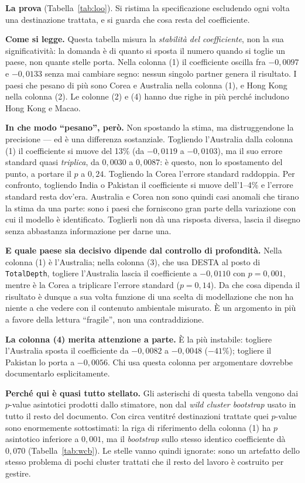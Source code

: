 \documentclass[11pt,a4paper]{article}
\begin{document}
\textbf{La prova} (Tabella~\ref{tab:loo}). Si ristima la specificazione escludendo ogni volta
una destinazione trattata, e si guarda che cosa resta del coefficiente.

\textbf{Come si legge.} Questa tabella misura la \emph{stabilit\`a del coefficiente}, non la
sua significativit\`a: la domanda \`e di quanto si sposta il numero quando si toglie un paese,
non quante stelle porta. Nella colonna (1) il coefficiente oscilla fra $-0{,}0097$ e
$-0{,}0133$ senza mai cambiare segno: nessun singolo partner genera il risultato. I paesi che
pesano di pi\`u sono Corea e Australia nella colonna (1), e Hong Kong nella colonna (2). Le
colonne (2) e (4) hanno due righe in pi\`u perch\'e includono Hong Kong e Macao.

\textbf{In che modo ``pesano'', per\`o.} Non spostando la stima, ma distruggendone la
precisione --- ed \`e una differenza sostanziale. Togliendo l'Australia dalla colonna (1) il
coefficiente si muove del 13\% (da $-0{,}0119$ a $-0{,}0103$), ma il suo errore standard
quasi \emph{triplica}, da $0{,}0030$ a $0{,}0087$: \`e questo, non lo spostamento del punto,
a portare il $p$ a $0{,}24$. Togliendo la Corea l'errore standard raddoppia. Per confronto,
togliendo India o Pakistan il coefficiente si muove dell'1--4\% e l'errore standard resta
dov'era. Australia e Corea non sono quindi casi anomali che tirano la stima da una parte:
sono i paesi che forniscono gran parte della variazione con cui il modello \`e identificato.
Toglierli non d\`a una risposta diversa, lascia il disegno senza abbastanza informazione per
darne una.

\textbf{E quale paese sia decisivo dipende dal controllo di profondit\`a.} Nella colonna (1)
\`e l'Australia; nella colonna (3), che usa DESTA al posto di \texttt{TotalDepth}, togliere
l'Australia lascia il coefficiente a $-0{,}0110$ con $p=0{,}001$, mentre \`e la Corea a
triplicare l'errore standard ($p=0{,}14$). Da che cosa dipenda il risultato \`e dunque a sua
volta funzione di una scelta di modellazione che non ha niente a che vedere con il contenuto
ambientale misurato. \`E un argomento in pi\`u a favore della lettura ``fragile'', non una
contraddizione.

\textbf{La colonna (4) merita attenzione a parte.} \`E la pi\`u instabile: togliere
l'Australia sposta il coefficiente da $-0{,}0082$ a $-0{,}0048$ ($-41\%$); togliere
il Pakistan lo porta a $-0{,}0056$. Chi usa questa colonna per argomentare dovrebbe
documentarlo esplicitamente.

\textbf{Perch\'e qui \`e quasi tutto stellato.} Gli asterischi di questa tabella vengono dai
$p$-value asintotici prodotti dallo stimatore, non dal \emph{wild cluster bootstrap} usato in
tutto il resto del documento. Con circa ventitr\'e destinazioni trattate quei $p$-value sono
enormemente sottostimati: la riga di riferimento della colonna (1) ha $p$ asintotico inferiore
a $0{,}001$, ma il \emph{bootstrap} sullo stesso identico coefficiente d\`a $0{,}070$
(Tabella~\ref{tab:wcb}). Le stelle vanno quindi ignorate: sono un artefatto dello stesso
problema di pochi cluster trattati che il resto del lavoro \`e costruito per gestire.
\end{document}

